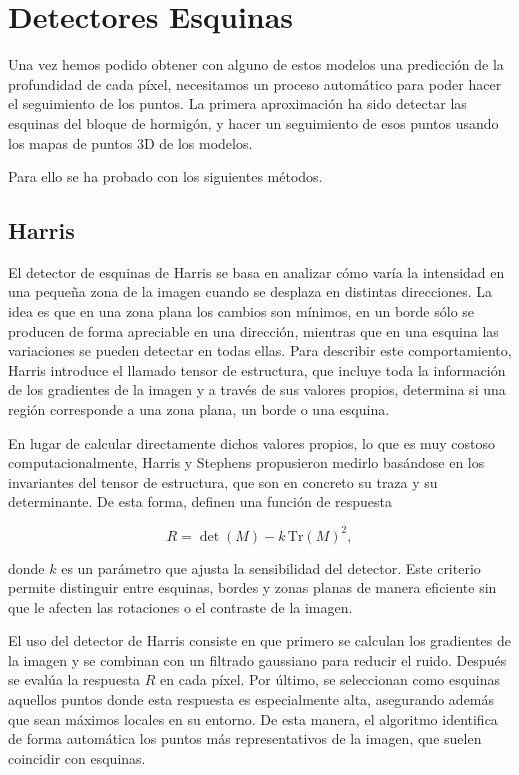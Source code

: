 
\section{Detectores Esquinas}
Una vez hemos podido obtener con alguno de estos modelos una predicción de la profundidad de cada píxel, necesitamos un proceso automático para poder hacer el seguimiento de los puntos. La primera aproximación ha sido detectar las esquinas del bloque de hormigón, y hacer un seguimiento de esos puntos usando los mapas de puntos 3D de los modelos.

Para ello se ha probado con los siguientes métodos.

\subsection{Harris}

El detector de esquinas de Harris \cite{harris1988combined} se basa en analizar cómo varía la intensidad en una pequeña zona de la imagen cuando se desplaza en distintas direcciones. La idea es que en una zona plana los cambios son mínimos, en un borde sólo se producen de forma apreciable en una dirección, mientras que en una esquina las variaciones se pueden detectar en todas ellas. Para describir este comportamiento, Harris introduce el llamado tensor de estructura, que incluye toda la información de los gradientes de la imagen y a través de sus valores propios, determina si una región corresponde a una zona plana, un borde o una esquina. 

En lugar de calcular directamente dichos valores propios, lo que es muy costoso computacionalmente, Harris y Stephens propusieron medirlo basándose en los invariantes del tensor de estructura, que son en concreto su traza y su determinante. De esta forma, definen una función de respuesta

\[
R = \det(M) - k \, \mathrm{Tr}(M)^2,
\]

donde \(k\) es un parámetro que ajusta la sensibilidad del detector. Este criterio permite distinguir entre esquinas, bordes y zonas planas de manera eficiente sin que le afecten las rotaciones o el contraste de la imagen.

El uso del detector de Harris consiste en que primero se calculan los gradientes de la imagen y se combinan con un filtrado gaussiano para reducir el ruido. Después se evalúa la respuesta \(R\) en cada píxel. Por último, se seleccionan como esquinas aquellos puntos donde esta respuesta es especialmente alta, asegurando además que sean máximos locales en su entorno. De esta manera, el algoritmo identifica de forma automática los puntos más representativos de la imagen, que suelen coincidir con esquinas.


